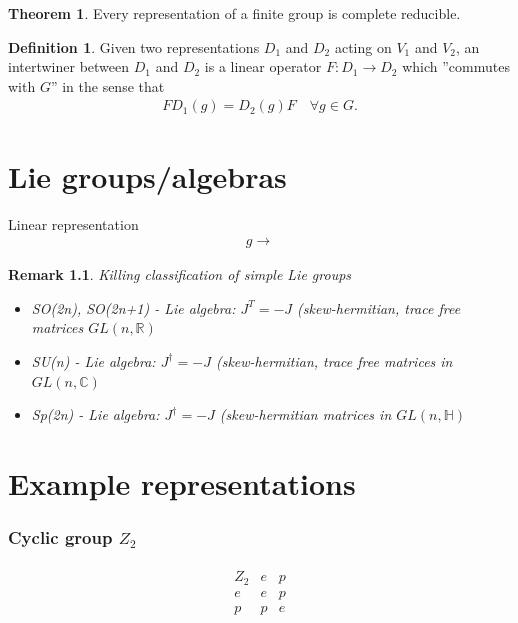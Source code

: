 \documentclass[10pt,a4paper]{book}
\newtheorem{remark}{Remark}[section]
\theoremstyle{definition}
\newtheorem{definition}{Definition}[section]
\newtheorem{theorem}{Theorem}[section]
\begin{document}
\begin{theorem}
Every representation of a finite group is complete reducible.
\end{theorem}

\begin{definition}{}
Given two representations $D_1$ and $D_2$ acting on $V_1$ and $V_2$, an intertwiner between $D_1$ and $D_2$ is a linear operator $F:D_1\rightarrow D_2$ which ''commutes with $G$'' in the sense that
\begin{align}
F D_1(g) = D_2(g)F\quad \forall g \in G. 
\end{align}
\end{definition}



\chapter{Lie groups/algebras}
Linear representation
\begin{align}
g\to
\end{align}


\begin{remark}{}
Killing classification of simple Lie groups
\begin{itemize}
    \item SO(2n), SO(2n+1) - Lie algebra: $J^T=-J$ (skew-hermitian, trace free matrices $GL(n,\mathbb{R})$
    \item SU(n) - Lie algebra: $J^\dagger=-J$ (skew-hermitian, trace free matrices in $GL(n,\mathbb{C})$
    \item Sp(2n) - Lie algebra: $J^\dagger=-J$ (skew-hermitian matrices in $GL(n,\mathbb{H})$
\end{itemize}
\end{remark}

\chapter{Example representations}
\subsection{Cyclic group \texorpdfstring{$Z_2$}{TEXT}}
\begin{align}
\begin{array}{c||cc}
Z_2 & e & p \\ \hline\hline
e & e & p \\
p & p & e
\end{array}
\end{align}
\end{document}
